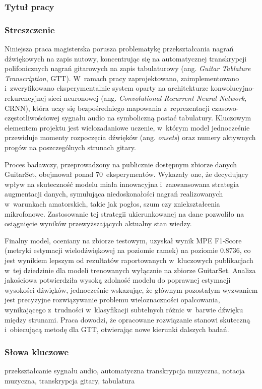 \subsubsection*{Tytuł pracy}
\Title

\subsubsection*{Streszczenie}
Niniejsza praca magisterska porusza problematykę przekształcania nagrań dźwiękowych na zapis nutowy, koncentrując się na automatycznej transkrypcji polifonicznych nagrań gitarowych na zapis tabulaturowy (ang. \textit{Guitar Tablature Transcription}, GTT). W~ramach pracy zaprojektowano, zaimplementowano i~zweryfikowano eksperymentalnie system oparty na architekturze konwolucyjno-rekurencyjnej sieci neuronowej (ang. \textit{Convolutional Recurrent Neural Network}, CRNN), która uczy się bezpośredniego mapowania z~reprezentacji czasowo-częstotliwościowej sygnału audio na symboliczną postać tabulatury. Kluczowym elementem projektu jest wielozadaniowe uczenie, w~którym model jednocześnie przewiduje momenty rozpoczęcia dźwięków (ang. \textit{onsets}) oraz numery aktywnych progów na poszczególnych strunach gitary.

Proces badawczy, przeprowadzony na publicznie dostępnym zbiorze danych GuitarSet, obejmował ponad 70~eksperymentów. Wykazały one, że decydujący wpływ na skuteczność modelu miała innowacyjna i~zaawansowana strategia augmentacji danych, symulująca niedoskonałości nagrań realizowanych w~warunkach amatorskich, takie jak pogłos, szum czy zniekształcenia mikrofonowe. Zastosowanie tej strategii ukierunkowanej na dane pozwoliło na osiągnięcie wyników przewyższających aktualny stan wiedzy.

Finalny model, oceniany na zbiorze testowym, uzyskał wynik MPE F1-Score (metryki estymacji wielodźwiękowej na poziomie ramek) na poziomie 0.8736, co jest wynikiem lepszym od rezultatów raportowanych w~kluczowych publikacjach w~tej dziedzinie dla modeli trenowanych wyłącznie na zbiorze GuitarSet. Analiza jakościowa potwierdziła wysoką zdolność modelu do poprawnej estymacji wysokości dźwięków, jednocześnie wskazując, że głównym pozostałym wyzwaniem jest precyzyjne rozwiązywanie problemu wieloznaczności opalcowania, wynikającego z~trudności w~klasyfikacji subtelnych różnic w~barwie dźwięku między strunami. Praca dowodzi, że opracowane rozwiązanie stanowi skuteczną i~obiecującą metodę dla GTT, otwierając nowe kierunki dalszych badań.

\subsubsection*{Słowa kluczowe}
przekształcanie sygnału audio, automatyczna transkrypcja muzyczna, notacja muzyczna, transkrypcja gitary, tabulatura

